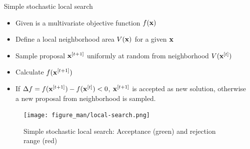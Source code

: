 \documentclass[11pt,compress,t,notes=noshow, xcolor=table]{beamer}
\begin{document}
\begin{vbframe}{Simple stochastic local search}
\vspace{-0.2cm}
\begin{small}
\begin{itemize}
\item Given is a multivariate objective function $f(\mathbf{x})$
\item Define a local neighborhood area $V(\mathbf{x})$ for a given $\mathbf{x}$
\item Sample proposal $\mathbf{x}^{[t+1]}$ uniformly at random from neighborhood $V(\mathbf{x}^{[t]})$
\item Calculate $f(\mathbf{x}^{[t+1]})$
\item If $\Delta f = f(\mathbf{x}^{[t+1]}) - f(\mathbf{x}^{[t]}) < 0$, $\mathbf{x}^{[t+1]}$ is accepted as new solution, otherwise a new proposal from neighborhood is sampled.
\end{itemize}
\end{small}

\vspace{-\baselineskip}

\begin{figure}
    \centering
    \texttt{[image: figure\_man/local-search.png]}
    \caption*{
        \footnotesize
        Simple stochastic local search: Acceptance (green) and rejection range (red)}
\end{figure}
\vspace{-0.5cm}



\end{vbframe}
\end{document}
